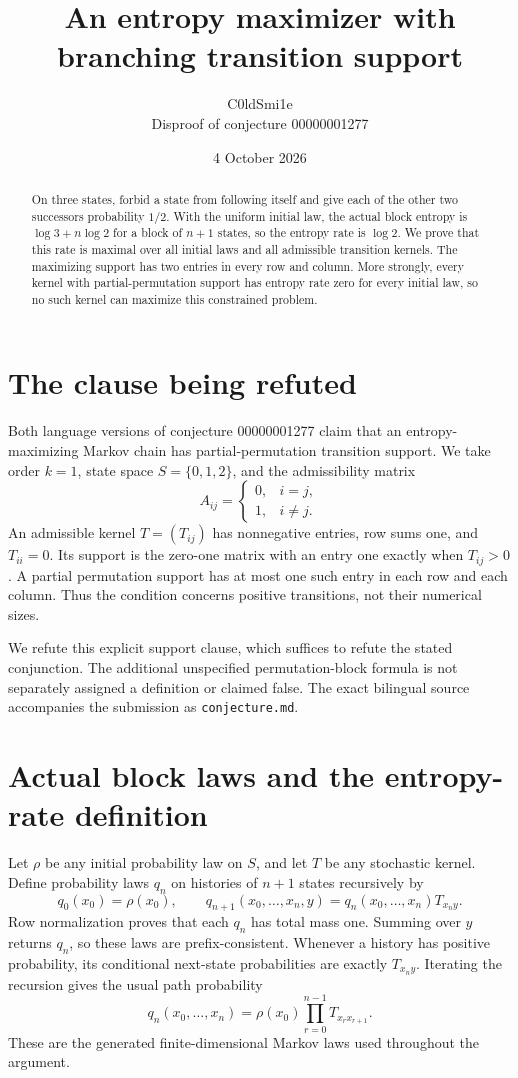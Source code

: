 \documentclass[10pt]{article}
\title{An entropy maximizer with branching transition support}
\author{C0ldSmi1e\\\small Disproof of conjecture 00000001277}
\date{4 October 2026}
\begin{document}
\maketitle
\begin{abstract}
On three states, forbid a state from following itself and give each of the other two successors probability $1/2$. With the uniform initial law, the actual block entropy is $\log3+n\log2$ for a block of $n+1$ states, so the entropy rate is $\log2$. We prove that this rate is maximal over all initial laws and all admissible transition kernels. The maximizing support has two entries in every row and column. More strongly, every kernel with partial-permutation support has entropy rate zero for every initial law, so no such kernel can maximize this constrained problem.
\end{abstract}

\section{The clause being refuted}
Both language versions of conjecture 00000001277 claim that an entropy-maximizing Markov chain has partial-permutation transition support. We take order $k=1$, state space $S=\{0,1,2\}$, and the admissibility matrix
\[
 A_{ij}=\begin{cases}0,&i=j,\\1,&i\ne j.\end{cases}
\]
An admissible kernel $T=(T_{ij})$ has nonnegative entries, row sums one, and $T_{ii}=0$. Its support is the zero-one matrix with an entry one exactly when $T_{ij}>0$. A partial permutation support has at most one such entry in each row and each column. Thus the condition concerns positive transitions, not their numerical sizes.

We refute this explicit support clause, which suffices to refute the stated conjunction. The additional unspecified permutation-block formula is not separately assigned a definition or claimed false. The exact bilingual source accompanies the submission as \texttt{conjecture.md}.

\section{Actual block laws and the entropy-rate definition}
Let $\rho$ be any initial probability law on $S$, and let $T$ be any stochastic kernel. Define probability laws $q_n$ on histories of $n+1$ states recursively by
\[
 q_0(x_0)=\rho(x_0),\qquad
 q_{n+1}(x_0,\ldots,x_n,y)=q_n(x_0,\ldots,x_n)T_{x_ny}.
\]
Row normalization proves that each $q_n$ has total mass one. Summing over $y$ returns $q_n$, so these laws are prefix-consistent. Whenever a history has positive probability, its conditional next-state probabilities are exactly $T_{x_ny}$. Iterating the recursion gives the usual path probability
\[
 q_n(x_0,\ldots,x_n)=\rho(x_0)\prod_{r=0}^{n-1}T_{x_rx_{r+1}}.
\]
These are the generated finite-dimensional Markov laws used throughout the argument.
\end{document}
